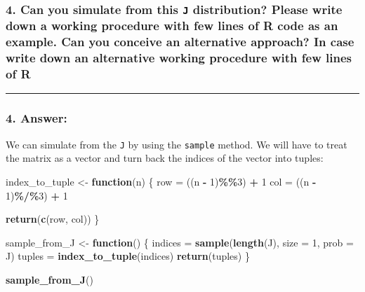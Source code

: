 \documentclass[
]{article}
\newenvironment{Shaded}{\begin{snugshade}}{\end{snugshade}}
\newcommand{\AttributeTok}[1]{\textcolor[rgb]{0.13,0.29,0.53}{#1}}
\newcommand{\ControlFlowTok}[1]{\textcolor[rgb]{0.13,0.29,0.53}{\textbf{#1}}}
\newcommand{\DecValTok}[1]{\textcolor[rgb]{0.00,0.00,0.81}{#1}}
\newcommand{\FunctionTok}[1]{\textcolor[rgb]{0.13,0.29,0.53}{\textbf{#1}}}
\newcommand{\NormalTok}[1]{#1}
\newcommand{\OtherTok}[1]{\textcolor[rgb]{0.56,0.35,0.01}{#1}}
\newcommand{\SpecialCharTok}[1]{\textcolor[rgb]{0.81,0.36,0.00}{\textbf{#1}}}
\begin{document}
\hypertarget{can-you-simulate-from-this-j-distribution-please-write-down-a-working-procedure-with-few-lines-of-r-code-as-an-example.-can-you-conceive-an-alternative-approach-in-case-write-down-an-alternative-working-procedure-with-few-lines-of-r}{%
\subsubsection{\texorpdfstring{4. Can you simulate from this \texttt{J}
distribution? Please write down a working procedure with few lines of R
code as an example. Can you conceive an alternative approach? In case
write down an alternative working procedure with few lines of
R}{4. Can you simulate from this J distribution? Please write down a working procedure with few lines of R code as an example. Can you conceive an alternative approach? In case write down an alternative working procedure with few lines of R}}\label{can-you-simulate-from-this-j-distribution-please-write-down-a-working-procedure-with-few-lines-of-r-code-as-an-example.-can-you-conceive-an-alternative-approach-in-case-write-down-an-alternative-working-procedure-with-few-lines-of-r}}

\begin{center}\rule{0.5\linewidth}{0.5pt}\end{center}

\hypertarget{answer-3}{%
\subsubsection{4. Answer:}\label{answer-3}}

We can simulate from the \texttt{J} by using the \texttt{sample} method.
We will have to treat the matrix as a vector and turn back the indices
of the vector into tuples:

\begin{Shaded}
\begin{Highlighting}[]
\NormalTok{index\_to\_tuple }\OtherTok{\textless{}{-}} \ControlFlowTok{function}\NormalTok{(n) \{}
\NormalTok{    row }\OtherTok{=}\NormalTok{ ((n }\SpecialCharTok{{-}} \DecValTok{1}\NormalTok{)}\SpecialCharTok{\%\%}\DecValTok{3}\NormalTok{) }\SpecialCharTok{+} \DecValTok{1}
\NormalTok{    col }\OtherTok{=}\NormalTok{ ((n }\SpecialCharTok{{-}} \DecValTok{1}\NormalTok{)}\SpecialCharTok{\%/\%}\DecValTok{3}\NormalTok{) }\SpecialCharTok{+} \DecValTok{1}

    \FunctionTok{return}\NormalTok{(}\FunctionTok{c}\NormalTok{(row, col))}
\NormalTok{\}}

\NormalTok{sample\_from\_J }\OtherTok{\textless{}{-}} \ControlFlowTok{function}\NormalTok{() \{}
\NormalTok{    indices }\OtherTok{=} \FunctionTok{sample}\NormalTok{(}\FunctionTok{length}\NormalTok{(J), }\AttributeTok{size =} \DecValTok{1}\NormalTok{, }\AttributeTok{prob =}\NormalTok{ J)}
\NormalTok{    tuples }\OtherTok{=} \FunctionTok{index\_to\_tuple}\NormalTok{(indices)}
    \FunctionTok{return}\NormalTok{(tuples)}
\NormalTok{\}}

\FunctionTok{sample\_from\_J}\NormalTok{()}
\end{Highlighting}
\end{Shaded}
\end{document}
